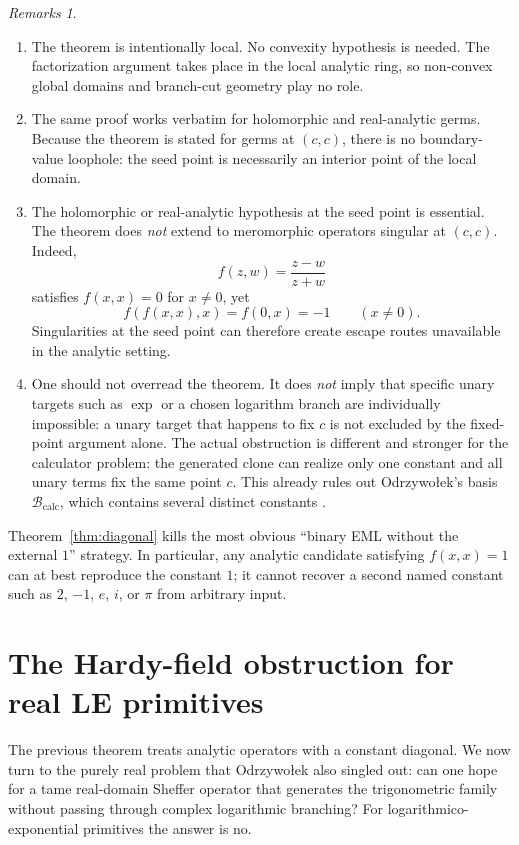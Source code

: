 \documentclass[12pt]{amsart}
\theoremstyle{remark}
\newtheorem*{remarks}{Remarks}
\begin{document}
\begin{remarks}
\leavevmode
\begin{enumerate}
    \item The theorem is intentionally local.  No convexity hypothesis is needed.  The factorization argument takes place in the local analytic ring, so non-convex global domains and branch-cut geometry play no role.
    \item The same proof works verbatim for holomorphic and real-analytic germs.  Because the theorem is stated for germs at $(c,c)$, there is no boundary-value loophole: the seed point is necessarily an interior point of the local domain.
    \item The holomorphic or real-analytic hypothesis at the seed point is essential.  The theorem does \emph{not} extend to meromorphic operators singular at $(c,c)$.  Indeed,
    \[
    f(z,w)=\frac{z-w}{z+w}
    \]
    satisfies $f(x,x)=0$ for $x\neq 0$, yet
    \[
    f(f(x,x),x)=f(0,x)=-1
    \qquad (x\neq 0).
    \]
    Singularities at the seed point can therefore create escape routes unavailable in the analytic setting.
    \item One should not overread the theorem.  It does \emph{not} imply that specific unary targets such as $\exp$ or a chosen logarithm branch are individually impossible: a unary target that happens to fix $c$ is not excluded by the fixed-point argument alone.  The actual obstruction is different and stronger for the calculator problem: the generated clone can realize only one constant and all unary terms fix the same point $c$.  This already rules out Odrzywo\l{}ek's basis $\mathcal{B}_{\mathrm{calc}}$, which contains several distinct constants \cite{Odrzywolek2026}.
\end{enumerate}
\end{remarks}

Theorem~\ref{thm:diagonal} kills the most obvious ``binary EML without the external $1$'' strategy.  In particular, any analytic candidate satisfying $f(x,x)=1$ can at best reproduce the constant $1$; it cannot recover a second named constant such as $2$, $-1$, $e$, $i$, or $\pi$ from arbitrary input.

\section{The Hardy-field obstruction for real LE primitives}\label{sec:hardy}

The previous theorem treats analytic operators with a constant diagonal.  We now turn to the purely real problem that Odrzywo\l{}ek also singled out: can one hope for a tame real-domain Sheffer operator that generates the trigonometric family without passing through complex logarithmic branching?  For logarithmico-exponential primitives the answer is no.
\end{document}
